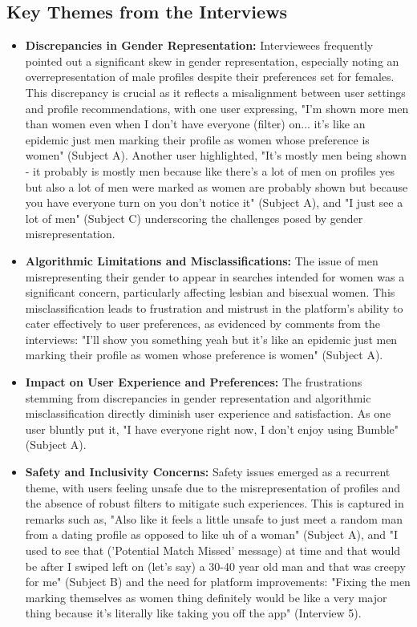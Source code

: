\subsection{Key Themes from the Interviews}
\begin{itemize}
    \item \textbf{Discrepancies in Gender Representation:} Interviewees frequently pointed out a significant skew in gender representation, especially noting an overrepresentation of male profiles despite their preferences set for females. This discrepancy is crucial as it reflects a misalignment between user settings and profile recommendations, with one user expressing, "I'm shown more men than women even when I don’t have everyone (filter) on... it's like an epidemic just men marking their profile as women whose preference is women" (Subject A). Another user highlighted, "It's mostly men being shown - it probably is mostly men because like there's a lot of men on profiles yes but also a lot of men were marked as women are probably shown but because you have everyone turn on you don't notice it" (Subject A), and "I just see a lot of men" (Subject C) underscoring the challenges posed by gender misrepresentation.
    \item \textbf{Algorithmic Limitations and Misclassifications:} The issue of men misrepresenting their gender to appear in searches intended for women was a significant concern, particularly affecting lesbian and bisexual women. This misclassification leads to frustration and mistrust in the platform's ability to cater effectively to user preferences, as evidenced by comments from the interviews: "I'll show you something yeah but it's like an epidemic just men marking their profile as women whose preference is women" (Subject A).
    \item \textbf{Impact on User Experience and Preferences:} The frustrations stemming from discrepancies in gender representation and algorithmic misclassification directly diminish user experience and satisfaction. As one user bluntly put it, "I have everyone right now, I don't enjoy using Bumble" (Subject A).
    \item \textbf{Safety and Inclusivity Concerns:} Safety issues emerged as a recurrent theme, with users feeling unsafe due to the misrepresentation of profiles and the absence of robust filters to mitigate such experiences. This is captured in remarks such as, "Also like it feels a little unsafe to just meet a random man from a dating profile as opposed to like uh of a woman" (Subject A), and "I used to see that ('Potential Match Missed' message) at time and that would be after I swiped left on (let's say) a 30-40 year old man and that was creepy for me" (Subject B) and the need for platform improvements: "Fixing the men marking themselves as women thing definitely would be like a very major thing because it's literally like taking you off the app" (Interview 5).

\end{itemize}
